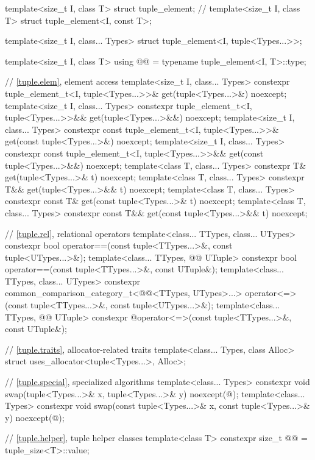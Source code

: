 \begin{codeblock}
{  template<size_t I, class T> struct tuple_element;     // \notdef
  template<size_t I, class T> struct tuple_element<I, const T>;

  template<size_t I, class... Types>
    struct tuple_element<I, tuple<Types...>>;

  template<size_t I, class T>
    using @@ = typename tuple_element<I, T>::type;

  // \ref{tuple.elem}, element access
  template<size_t I, class... Types>
    constexpr tuple_element_t<I, tuple<Types...>>& get(tuple<Types...>&) noexcept;
  template<size_t I, class... Types>
    constexpr tuple_element_t<I, tuple<Types...>>&& get(tuple<Types...>&&) noexcept;
  template<size_t I, class... Types>
    constexpr const tuple_element_t<I, tuple<Types...>>& get(const tuple<Types...>&) noexcept;
  template<size_t I, class... Types>
    constexpr const tuple_element_t<I, tuple<Types...>>&& get(const tuple<Types...>&&) noexcept;
  template<class T, class... Types>
    constexpr T& get(tuple<Types...>& t) noexcept;
  template<class T, class... Types>
    constexpr T&& get(tuple<Types...>&& t) noexcept;
  template<class T, class... Types>
    constexpr const T& get(const tuple<Types...>& t) noexcept;
  template<class T, class... Types>
    constexpr const T&& get(const tuple<Types...>&& t) noexcept;

  // \ref{tuple.rel}, relational operators
  template<class... TTypes, class... UTypes>
    constexpr bool operator==(const tuple<TTypes...>&, const tuple<UTypes...>&);
  template<class... TTypes, @@ UTuple>
    constexpr bool operator==(const tuple<TTypes...>&, const UTuple&);
  template<class... TTypes, class... UTypes>
    constexpr common_comparison_category_t<@@<TTypes, UTypes>...>
      operator<=>(const tuple<TTypes...>&, const tuple<UTypes...>&);
  template<class... TTypes, @@ UTuple>
    constexpr @\seebelownc@ operator<=>(const tuple<TTypes...>&, const UTuple&);

  // \ref{tuple.traits}, allocator-related traits
  template<class... Types, class Alloc>
    struct uses_allocator<tuple<Types...>, Alloc>;

  // \ref{tuple.special}, specialized algorithms
  template<class... Types>
    constexpr void swap(tuple<Types...>& x, tuple<Types...>& y) noexcept(@\seebelow@);
  template<class... Types>
    constexpr void swap(const tuple<Types...>& x, const tuple<Types...>& y) noexcept(@\seebelow@);

  // \ref{tuple.helper}, tuple helper classes
  template<class T>
    constexpr size_t @@ = tuple_size<T>::value;
}
\end{codeblock}

